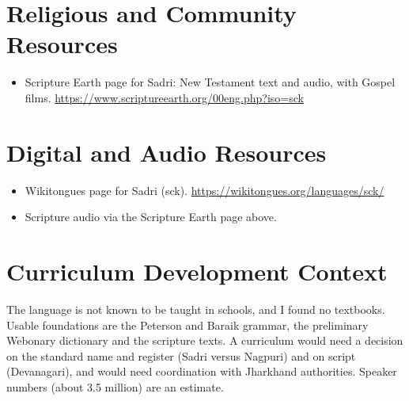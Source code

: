\documentclass[12pt]{article}
\begin{document}
\section{Religious and Community Resources}
\begin{itemize}
\item Scripture Earth page for Sadri: New Testament text and audio, with Gospel films. \url{https://www.scriptureearth.org/00eng.php?iso=sck}
\end{itemize}

\section{Digital and Audio Resources}
\begin{itemize}
\item Wikitongues page for Sadri (sck). \url{https://wikitongues.org/languages/sck/}
\item Scripture audio via the Scripture Earth page above.
\end{itemize}

\section{Curriculum Development Context}
The language is not known to be taught in schools, and I found no textbooks. Usable foundations are the Peterson and Baraik grammar, the preliminary Webonary dictionary and the scripture texts. A curriculum would need a decision on the standard name and register (Sadri versus Nagpuri) and on script (Devanagari), and would need coordination with Jharkhand authorities. Speaker numbers (about 3.5 million) are an estimate.
\end{document}
